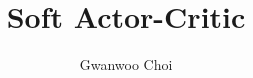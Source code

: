 \documentclass[8pt]{beamer}
\title{Soft Actor-Critic}
\author{Gwanwoo Choi}
\begin{document}
\begin{frame}
    \titlepage
\end{frame}




\end{document}
